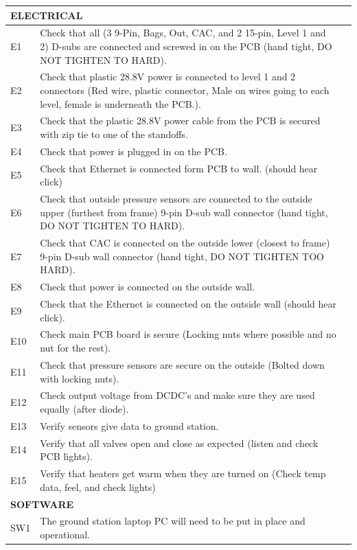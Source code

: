 \documentclass[a4paper,12pt,oneside]{article}
\providecommand{\DIFaddend}{} %
\DeclareRobustCommand{\DIFaddend}{\DIFOaddend \let\includegraphics\DIFOincludegraphics} %
\begin{document}
\begin{appendices}
\begin{longtable} {|m{}|m{}|m{}|}
\DIFaddend \multicolumn{2}{|l|}{  \textbf{ELECTRICAL} } & \\ \hline
E1 & Check that all (3 9-Pin, Bags, Out, CAC, and 2 15-pin, Level 1 and 2) D-subs are connected and screwed in on the PCB (hand tight, DO NOT TIGHTEN TO HARD). & \\ \hline
E2 & Check that plastic 28.8V power is connected to level 1 and 2 connectors (Red wire, plastic connector, Male on wires going to each level, female is underneath the PCB.).& \\ \hline
E3 & Check that the plastic 28.8V power cable from the PCB is secured with zip tie to one of the standoffs. & \\ \hline 
E4 & Check that power is plugged in on the PCB. & \\ \hline
E5 & Check that Ethernet is connected form PCB to wall. (should hear click) & \\ \hline
E6 & Check that outside pressure sensors are connected to the outside upper (furthest from frame) 9-pin D-sub wall connector (hand tight, DO NOT TIGHTEN TO HARD). & \\ \hline
E7 & Check that CAC is connected on the outside lower (closest to frame) 9-pin D-sub wall connector (hand tight, DO NOT TIGHTEN TOO HARD). & \\ \hline
E8 & Check that power is connected on the outside wall. & \\ \hline
E9 & Check that the Ethernet is connected on the outside wall (should hear click). & \\ \hline
E10 & Check main PCB board is secure (Locking nuts where possible and no nut for the rest).\\ \hline
E11 & Check that pressure sensors are secure on the outside (Bolted down with locking nuts). & \\ \hline
E12 & Check output voltage from DCDC's and make sure they are used equally (after diode). & \\ \hline
E13 & Verify sensors give data to ground station. & \\ \hline
E14 & Verify that all valves open and close as expected (listen and check PCB lights).& \\ \hline
E15 & Verify that heaters get warm when they are turned on (Check temp data, feel, and check lights)& \\ \hline
\multicolumn{2}{|l|}{  \textbf{SOFTWARE} } & \\ \hline
SW1 & The ground station laptop PC will need to be put in place and operational. & \\ \hline

\end{longtable}
\end{appendices}
\end{document}
